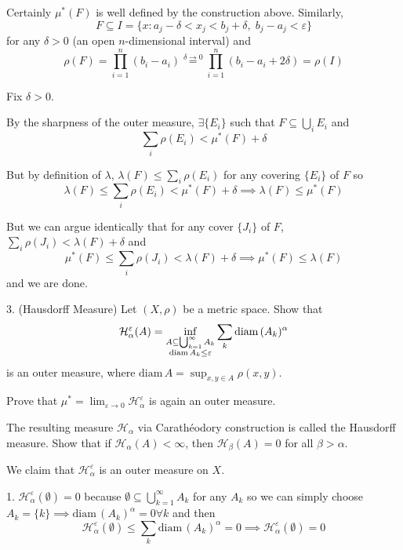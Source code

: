 \documentclass[12pt]{article}
\newcommand{\ep}{\varepsilon}
\renewcommand{\H}{\mathcal{H}}
\newcommand{\diam}{\text{diam}\,}
\newcommand{\sub}{\subseteq}
\newenvironment*{proof}[1][blue]{
    \begin{tcolorbox}[
        parbox=false,
        colback=#1!5!white,
        colframe=#1!75!black,
        coltext=#1,
        breakable
    ]}
    {\end{tcolorbox}}
\begin{document}
    \begin{proof}
        Certainly $\mu^*(F)$ is well defined by the construction above. Similarly, 
        \[F \sub I = \{x: a_j - \delta < x_j < b_j + \delta,\; b_j - a_j < \ep\}\] 
        for any $\delta > 0$ (an open $n$-dimensional interval) and 
        \[\rho(F) = \prod_{i=1}^n (b_i - a_i) \overset{\delta \to 0}{=} \prod_{i=1}^n (b_i - a_i + 2\delta) = \rho(I)\]

        Fix $\delta > 0$. 

        By the sharpness of the outer measure, $\exists \{E_i\}$ such that $F \sub \bigcup_i E_i$ and
        \[\sum_i \rho(E_i) < \mu^*(F) + \delta\]

        But by definition of $\lambda$, $\lambda(F) \leq \sum_i \rho(E_i)$ for any covering $\{E_i\}$ of $F$ so 
        \[\lambda(F) \leq \sum_i \rho(E_i) < \mu^*(F) + \delta \implies \lambda(F) \leq \mu^*(F)\]

        But we can argue identically that for any cover $\{J_i\}$ of $F$, $\sum_i \rho(J_i) < \lambda(F) + \delta$ and 
        \[\mu^*(F) \leq \sum_i \rho(J_i) < \lambda(F) + \delta \implies \mu^*(F) \leq \lambda(F)\]
        and we are done.     
    \end{proof}
  
\color{black}


\pagebreak

3. (Hausdorff Measure) Let $(X, \rho)$ be a metric space. Show that 
\[\H_{\alpha}^{\ep}(A) = \inf_{\begin{subarray}{c} A \sub \bigcup_{k=1}^\infty A_k\\ \diam A_k \leq \ep \end{subarray}} \sum_k \diam(A_k)^\alpha\]
is an outer measure, where $\diam A = \sup_{x,y \in A} \rho(x,y)$.

Prove that $\mu^* = \lim_{\ep \to 0} \H_{\alpha}^{\ep}$ is again an outer measure.

The resulting measure $\H_{\alpha}$ via Carathéodory construction is called the Hausdorff measure. Show that if $\H_{\alpha}(A) < \infty$, then $\H_{\beta}(A) = 0$ for all $\beta > \alpha$. 

\color{blue}
    We claim that $\H_{\alpha}^{\ep}$ is an outer measure on $X$.

    1. $\H_{\alpha}^{\ep}(\emptyset) = 0$ because $\emptyset \sub \bigcup_{k=1}^\infty A_k$ for any $A_k$ so we can simply choose $A_k = \{k\} \implies \diam(A_k)^{\alpha} = 0 \forall k$ and then 
    \[\H_{\alpha}^{\ep}(\emptyset) \leq \sum_k \diam(A_k)^{\alpha} = 0 \implies \H_{\alpha}^{\ep}(\emptyset) = 0\]
\end{document}
